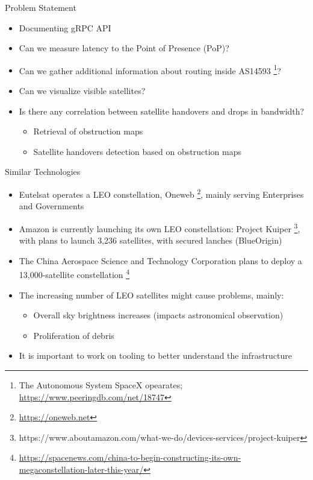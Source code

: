 \documentclass[NET,english,beameralt]{tumbeamer}
\begin{document}
\begin{frame}{Problem Statement}
    \begin{itemize}
        \item Documenting gRPC API
        \item Can we measure latency to the Point of Presence (PoP)?
        \item Can we gather additional information about routing inside AS14593 
              \footnote{The Autonomous System SpaceX opearates; \url{https://www.peeringdb.com/net/18747}}?
        \item Can we visualize visible satellites?
        \item Is there any correlation between satellite handovers and drops in bandwidth?
            \begin{itemize}
                \item Retrieval of obstruction maps
                \item Satellite handovers detection based on obstruction maps
            \end{itemize}
    \end{itemize}
\end{frame}

\begin{frame}{Similar Technologies}
    \begin{itemize}
        \item Eutelsat operates a LEO constellation, Oneweb \footnote{\url{https://oneweb.net}}, mainly serving Enterprises and Governments
        \item Amazon is currently launching its own LEO constellation: Project Kuiper 
              \footnote{https://www.aboutamazon.com/what-we-do/devices-services/project-kuiper}, with plans to launch 3,236 satellites,
               with secured lanches (BlueOrigin)
        \item The China Aerospace Science and Technology Corporation plans to deploy a 13,000-satellite constellation
                \footnote{\url{https://spacenews.com/china-to-begin-constructing-its-own-megaconstellation-later-this-year/}}
        \item The increasing number of LEO satellites might cause problems, mainly:
        \begin{itemize}
            \item Overall sky brightness increases (impacts astronomical observation)
            \item Proliferation of debris
        \end{itemize}
        \item It is important to work on tooling to better understand the infrastructure
    \end{itemize}
\end{frame}
\end{document}
